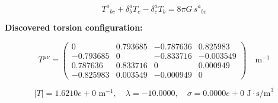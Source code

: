 
\begin{equation}
  T^a{}_{bc} + \delta^a_b T_c - \delta^a_c T_b = 8\pi G \, s^a{}_{bc}
\end{equation}

\textbf{Discovered torsion configuration:}

\begin{equation}
  T^{\mu\nu} = \begin{pmatrix}
    0 & 0.793685 & -0.787636 & 0.825983 \\
    -0.793685 & 0 & -0.833716 & -0.003549 \\
    0.787636 & 0.833716 & 0 & 0.000949 \\
    -0.825983 & 0.003549 & -0.000949 & 0
  \end{pmatrix} \quad \text{m}^{-1}
\end{equation}

\begin{equation}
  |T| = 1.6210e+0 \text{ m}^{-1}, \quad
  \lambda = -10.0000, \quad
  \sigma = 0.0000e+0 \text{ J}\cdot\text{s/m}^3
\end{equation}